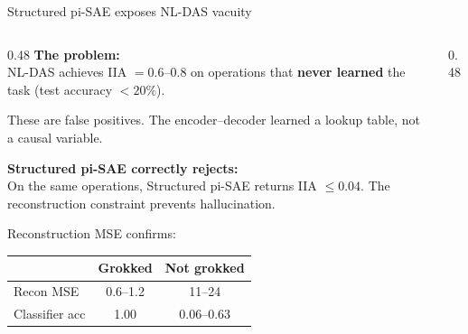 \documentclass[aspectratio=169,11pt]{beamer}
\begin{document}
\begin{frame}{Structured pi-SAE exposes NL-DAS vacuity}

\begin{columns}[T]
\begin{column}{0.48\textwidth}
\textbf{The problem:}\\[0.3em]
{\small NL-DAS achieves IIA $= 0.6$--$0.8$ on operations that \textbf{never learned} the task (test accuracy $< 20\%$).}

\vspace{0.3em}
{\small These are false positives. The encoder--decoder learned a lookup table, not a causal variable.}

\vspace{0.5em}
\textbf{Structured pi-SAE correctly rejects:}\\[0.3em]
{\small On the same operations, Structured pi-SAE returns IIA $\leq 0.04$. The reconstruction constraint prevents hallucination.}

\vspace{0.3em}
{\small Reconstruction MSE confirms:}\\[0.2em]
{\small\setlength{\tabcolsep}{3pt}
\begin{tabular}{@{}lcc@{}}
& \textbf{Grokked} & \textbf{Not grokked} \\
\midrule
{\small Recon MSE} & 0.6--1.2 & 11--24 \\
{\small Classifier acc} & 1.00 & 0.06--0.63 \\
\end{tabular}}
\end{column}
\begin{column}{0.48\textwidth}
\centering
\vspace{0.5em}
\end{column}
\end{columns}
\end{frame}
\end{document}
